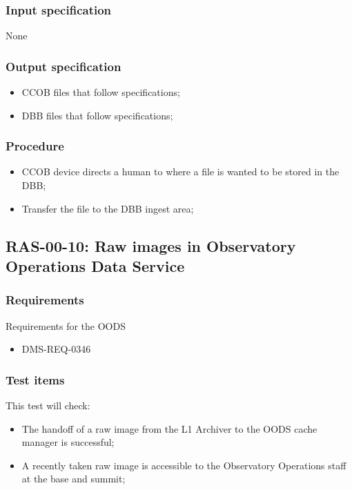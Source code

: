 \documentclass[DM,lsstdraft,STS,toc]{lsstdoc}
\begin{document}
\subsubsection{Input specification}
None
\subsubsection{Output specification}
\begin{itemize}
\item{CCOB files that follow specifications;}
\item{DBB files that follow specifications;}
\end{itemize}


\subsubsection{Procedure}
\begin{itemize}
\item{CCOB device directs a human to where a file is wanted to be stored in the DBB;}
\item{Transfer the file to the DBB ingest area; }
\end{itemize}




\subsection{RAS-00-10: Raw images in Observatory Operations Data Service}
\label{ras-00-10}
\subsubsection{Requirements}
Requirements for the OODS
\begin{itemize}
\item{DMS-REQ-0346}
\end{itemize}


\subsubsection{Test items}
This test will check:
\begin{itemize}
\item{The handoff of a raw image from the L1 Archiver to the OODS cache manager is successful;}
\item{A recently taken raw image is accessible to the Observatory Operations staff at the base and summit;}
\end{itemize}
\end{document}
